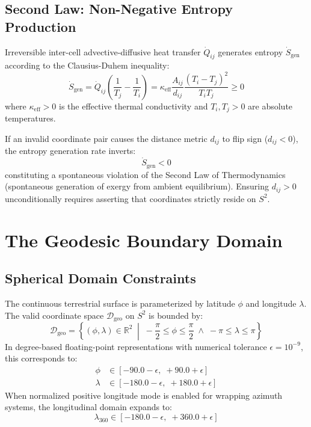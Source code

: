 \documentclass[11pt, a4paper]{article}
\begin{document}
\subsection{Second Law: Non-Negative Entropy Production}

Irreversible inter-cell advective-diffusive heat transfer $\dot{Q}_{ij}$ generates entropy $\dot{S}_{\text{gen}}$ according to the Clausius-Duhem inequality:
\begin{equation}
\dot{S}_{\text{gen}} = \dot{Q}_{ij} \left( \frac{1}{T_j} - \frac{1}{T_i} \right) = \kappa_{\text{eff}} \frac{A_{ij}}{d_{ij}} \frac{(T_i - T_j)^2}{T_i T_j} \ge 0
\end{equation}
where $\kappa_{\text{eff}} > 0$ is the effective thermal conductivity and $T_i, T_j > 0$ are absolute temperatures. 

If an invalid coordinate pair causes the distance metric $d_{ij}$ to flip sign ($d_{ij} < 0$), the entropy generation rate inverts:
\begin{equation}
\dot{S}_{\text{gen}} < 0
\end{equation}
constituting a spontaneous violation of the Second Law of Thermodynamics (spontaneous generation of exergy from ambient equilibrium). Ensuring $d_{ij} > 0$ unconditionally requires asserting that coordinates strictly reside on $S^2$.

\section{The Geodesic Boundary Domain}

\subsection{Spherical Domain Constraints}

The continuous terrestrial surface is parameterized by latitude $\phi$ and longitude $\lambda$. The valid coordinate space $\mathcal{D}_{\text{geo}}$ on $S^2$ is bounded by:
\begin{equation}
\mathcal{D}_{\text{geo}} = \left\{ (\phi, \lambda) \in \mathbb{R}^2 \;\middle|\; -\frac{\pi}{2} \le \phi \le \frac{\pi}{2} \;\land\; -\pi \le \lambda \le \pi \right\}
\end{equation}
In degree-based floating-point representations with numerical tolerance $\epsilon = 10^{-9}$, this corresponds to:
\begin{align}
\phi &\in [-90.0 - \epsilon, \; +90.0 + \epsilon] \\
\lambda &\in [-180.0 - \epsilon, \; +180.0 + \epsilon]
\end{align}
When normalized positive longitude mode is enabled for wrapping azimuth systems, the longitudinal domain expands to:
\begin{equation}
\lambda_{360} \in [-180.0 - \epsilon, \; +360.0 + \epsilon]
\end{equation}
\end{document}

